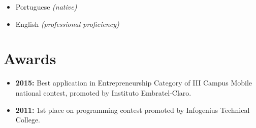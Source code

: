 \documentclass[11pt,a4paper,sans]{moderncv}        %
\begin{document}
\vspace{6pt}

\begin{itemize}

\item{Portuguese \textit{(native)}}
\item{English \textit{(professional proficiency)}}

\end{itemize}

\section{Awards}

\vspace{6pt}
 
\begin{itemize}

\item{\textbf{2015:} Best application in Entrepreneurship Category of III Campus Mobile national contest, promoted by Instituto Embratel-Claro.}

\item{\textbf{2011:} 1st place on programming contest promoted by Infogenius Technical College.}

\end{itemize}

\nocite{*}



\end{document}
